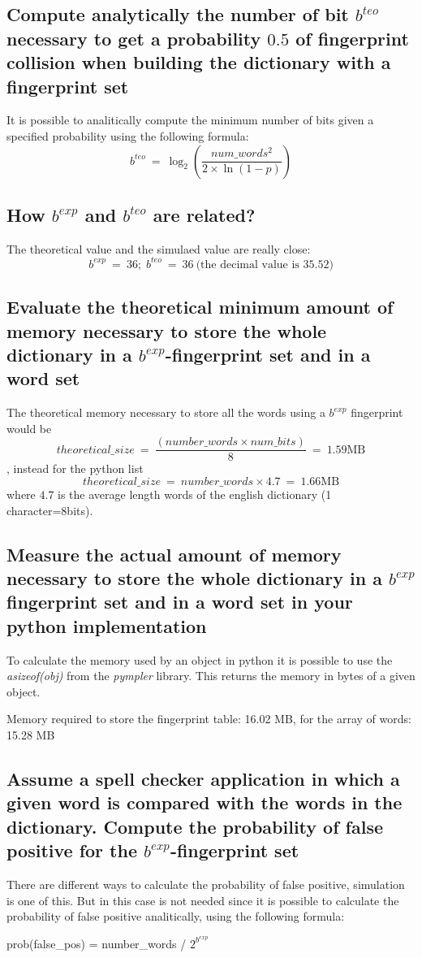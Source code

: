 \documentclass{report}
\begin{document}
			\subsection{Compute analytically the number of bit $b^{teo}$ necessary to get a probability $0.5$ of fingerprint collision when building the dictionary with a fingerprint set}
					It is possible to analitically compute the minimum number of bits given a specified probability using the following formula:
					\[
						b^{teo} \: = \: \log_2{ \left( \frac{num\_words^2}{2\times \ln\left({1-p}\right)} \right)}
					\]
			\subsection{How $b^{exp}$ and $b^{teo}$ are related?}
					The theoretical value and the simulaed value are really close: 
					\[
							b^{exp} \: = \: 36; \; 	b^{teo} \: = \: 36 \: \text{(the decimal value is 35.52)}
					\]
			
			\subsection{Evaluate the theoretical minimum amount of memory necessary to store the whole dictionary in a $b^{exp}$-fingerprint set and in a word set}
			The theoretical memory necessary to store all the words using a $b^{exp}$ fingerprint would be \[ theoretical\_size \: = \: \frac{(number\_words \times num\_bits)}{8} \: = \: 1.59 \text{MB}\], instead for the python list \[ theoretical\_size \: = \: number\_words \times 4.7 \: = \: 1.66 \text{MB}\] where $4.7$ is the average length words of the english dictionary (1 character=8bits).
						
			\subsection{Measure the actual amount of memory necessary to store the whole dictionary in a $b^{exp}$ fingerprint set and in a word set in your python implementation}
			To calculate the memory used by an object in python it is possible to use the \emph{asizeof(obj)} from the \emph{pympler} library. This returns the memory in bytes of a given object.
			\begin{center}
					Memory required to store the fingerprint table: 16.02 MB, for the array of words: 15.28 MB
			\end{center}
			
			\subsection{Assume a spell checker application in which a given word is compared with the words in the dictionary. Compute the probability of false positive for the $b^{exp}$-fingerprint set}
			There are different ways to calculate the probability of false positive, simulation is one of this. But in this case is not needed since it is possible to calculate the probability of false positive analitically, using the following formula:
			\begin{center}
					prob(false\_pos) = number\_words / $2^{b^{exp}}$
			\end{center}
			
\end{document}
